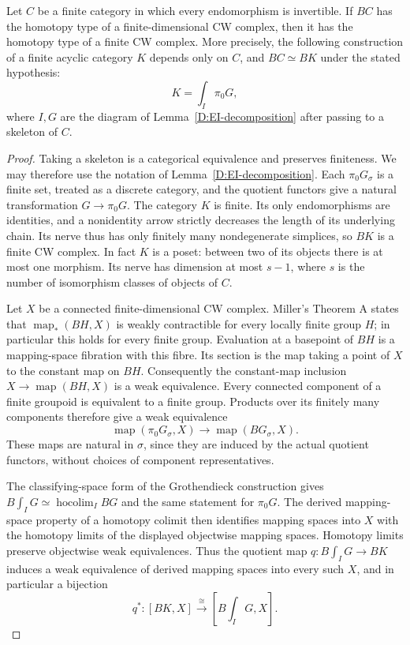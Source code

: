 \begin{theorem}
\label{D:EI-finite}
Let $C$ be a finite category in which every endomorphism is invertible.
If $BC$ has the homotopy type of a finite-dimensional CW complex, then
it has the homotopy type of a finite CW complex.  More precisely, the
following construction of a finite acyclic category $K$ depends only
on $C$, and $BC\simeq BK$ under the stated hypothesis:
\[
 K=\int_I\pi_0G,
\]
where $I,G$ are the diagram of Lemma~\ref{D:EI-decomposition} after
passing to a skeleton of $C$.
\end{theorem}
\begin{proof}
Taking a skeleton is a categorical equivalence and preserves
finiteness.  We may therefore use the notation of
Lemma~\ref{D:EI-decomposition}.  Each $\pi_0G_\sigma$ is a finite
set, treated as a discrete category, and the quotient functors give
a natural transformation $G\to\pi_0G$.  The category $K$ is finite.
Its only endomorphisms are identities, and a nonidentity arrow strictly
decreases the length of its underlying chain.  Its nerve thus has
only finitely many nondegenerate simplices, so $BK$ is a finite CW
complex.  In fact $K$ is a poset: between two of its objects there is
at most one morphism.  Its nerve has dimension at most $s-1$, where
$s$ is the number of isomorphism classes of objects of $C$.

Let $X$ be a connected finite-dimensional CW complex.  Miller's
Theorem A \cite[Theorem A, p.~39]{miller1984D} states that
$\operatorname{map}_*(BH,X)$ is weakly
contractible for every locally finite group $H$; in particular this
holds for every finite group.  Evaluation at a basepoint of $BH$ is
a mapping-space fibration with this fibre.  Its section is the map
taking a point of $X$ to the constant map on $BH$.  Consequently the
constant-map inclusion
$X\to\operatorname{map}(BH,X)$ is a weak equivalence.
Every connected component of a finite groupoid is equivalent to a
finite group.  Products over its finitely many components therefore
give a weak equivalence
\[
 \operatorname{map}(\pi_0G_\sigma,X)
 \longrightarrow\operatorname{map}(BG_\sigma,X).
\]
These maps are natural in $\sigma$, since they are induced by the
actual quotient functors, without choices of component representatives.

The classifying-space form of the Grothendieck construction
\cite[Corollary 26.9, derived from Theorem 26.8]{chacholskiScherer2002D} gives
$B\int_I G\simeq\operatorname{hocolim}_I BG$ and the same statement
for $\pi_0G$.  The derived mapping-space property of a homotopy
colimit then identifies mapping spaces into $X$ with the homotopy
limits of the displayed objectwise mapping spaces.  Homotopy limits
preserve objectwise weak equivalences.  Thus the quotient map
$q:B\int_I G\to BK$ induces a weak equivalence of derived mapping
spaces into every such $X$, and in particular a bijection
\[
 q^*:[BK,X]\xrightarrow{\cong}[B\textstyle\int_I G,X].
\]


\end{proof}
